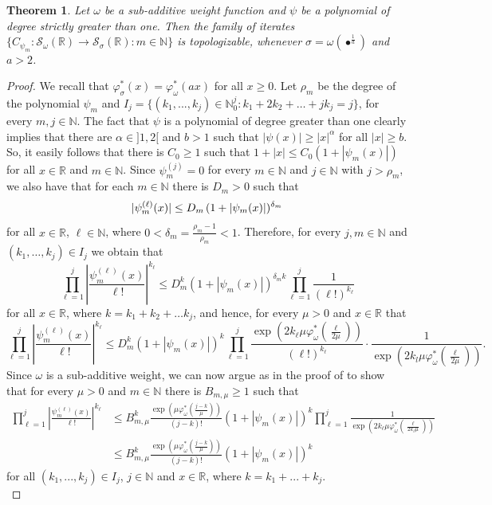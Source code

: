 \documentclass[12pt,reqno]{amsart} %
\newtheorem{theorem}{Theorem}[section]
\numberwithin{equation}{section}
\begin{document}
\begin{theorem}\label{toppolynomialsfirst}
	Let $\omega$ be a sub-additive weight function and $\psi$ be a polynomial of degree strictly greater than one. Then the family of iterates $\{C_{\psi_m}:\mathcal{S}_{\omega}(\mathbb{R})\to \mathcal{S}_{\sigma}(\mathbb{R}):m\in\mathbb{N}\}$ is topologizable, whenever $\sigma=\omega(\bullet^{\frac{1}{a}})$ and $a>2$.
\end{theorem}
\begin{proof}
	We recall that $\varphi^*_\sigma(x)=\varphi^*_\omega(ax)$ for all $x\geq 0$. Let $\rho_m$ be the degree of the polynomial $\psi_m$ and $I_j=\{(k_1,...,k_j)\in\mathbb{N}_0^j: k_1+2k_2+\ldots+j k_j=j\}$, for every $m,j\in\mathbb{N}$. The fact that $\psi$ is a polynomial of degree greater than one clearly implies that there are $\alpha\in ]1,2[$ and $b>1$ such that $|\psi(x)|\geq |x|^\alpha$ for all $|x|\geq b$. So, it easily follows that there is $C_0\geq 1$ such that $1+|x|\leq C_0 (1+|\psi_m(x)|)$ for all $x\in\mathbb{R}$ and $m\in\mathbb{N}$. Since $\psi_m^{(j)}=0$ for every $m\in\mathbb{N}$ and $j\in\mathbb{N}$ with $j>\rho_m$,
	we also have that for each $m\in\mathbb{N}$ there is $D_m>0$ such that \begin{equation*}
		|\psi_m^{(\ell)}(x)|\leq D_m \hspace{0.05cm} (1+|\psi_m(x)|)^{\delta_m}
	\end{equation*} 
	for all $x\in\mathbb{R}$, $\ell\in\mathbb{N}$, where $0<\delta_m=\frac{\rho_m-1}{\rho_m}<1$. Therefore, for every $j,m\in \mathbb{N}$ and $(k_1,\ldots,k_j)\in I_j$ we obtain that
	\begin{equation*}
		\prod_{\ell=1}^j \left|\frac{\psi_m^{(\ell)}(x)}{\ell!}\right|^{k_\ell}\leq D_m^k(1+|\psi_m(x)|)^{\delta_mk}\prod_{\ell=1}^j\frac{1}{(\ell!)^{k_\ell}}
	\end{equation*}
	for all $x\in \mathbb{R}$, where $k=k_1+k_2+\ldots k_j$, and hence,  for every $\mu>0$ and  $x\in \mathbb{R}$ that 
	\begin{equation*}
		\prod_{\ell=1}^j \left|\frac{\psi_m^{(\ell)}(x)}{\ell!}\right|^{k_\ell}\leq D_m^k(1+|\psi_m(x)|)^{k}\prod_{\ell=1}^j\frac{\exp\left(2k_\ell\mu \varphi^*_\omega(\frac{\ell}{2\mu})\right)}{(\ell!)^{k_\ell}}\cdot \frac{1}{\exp\left(2k_l\mu \varphi^*_\omega(\frac{\ell}{2\mu})\right)}.
	\end{equation*}
	Since $\omega$ is a sub-additive weight, we can now argue as in the proof of \cite[Proposition 2.1]{fg} to show 
	that for every $\mu>0$ and $m\in\mathbb{N}$ there is $B_{m,\mu}\geq 1$ such that 
	\begin{align*}
		\prod_{\ell=1}^j \left|\frac{\psi_m^{(\ell)}(x)}{\ell!}\right|^{k_\ell}&\leq B_{m,\mu}^k \frac{\exp\left(\mu \varphi^*_\omega(\frac{j-k}{\mu})\right)}{(j-k)!} (1+|\psi_m(x)|)^k \prod_{\ell=1}^j \frac{1}{\exp\left(2k_\ell\mu \varphi^*_\omega(\frac{\ell}{2k_\ell\mu})\right)}\\
		&\leq B_{m,\mu}^k \frac{\exp\left(\mu \varphi^*_\omega(\frac{j-k}{\mu})\right)}{(j-k)!} (1+|\psi_m(x)|)^k 
	\end{align*}
	for all $(k_1,...,k_j)\in I_j$, $j\in \mathbb{N}$ and $x\in\mathbb{R}$, where $k=k_1+...+k_j$. \\
	

\end{proof}
\end{document}
